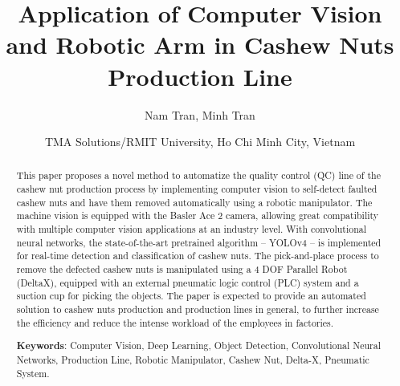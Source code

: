 \documentclass[10pt, letterpaper]{article}
\title{Application of Computer Vision and Robotic Arm in Cashew Nuts Production Line}
\author{Nam Tran, Minh Tran}
\date{TMA Solutions/RMIT University, Ho Chi Minh City, Vietnam} %
\begin{document}
\maketitle

\begin{abstract}
    This paper proposes a novel method to automatize the quality control (QC) line of the cashew nut production process by implementing computer vision to self-detect faulted cashew nuts and have them removed automatically using a robotic manipulator. The machine vision is equipped with the Basler Ace 2 camera, allowing great compatibility with multiple computer vision applications at an industry level. With convolutional neural networks, the state-of-the-art pretrained algorithm – YOLOv4 – is implemented for real-time detection and classification of cashew nuts. The pick-and-place process to remove the defected cashew nuts is manipulated using a 4 DOF Parallel Robot (DeltaX), equipped with an external pneumatic logic control (PLC) system and a suction cup for picking the objects. The paper is expected to provide an automated solution to cashew nuts production and production lines in general, to further increase the efficiency and reduce the intense workload of the employees in factories.\par
    \textbf{Keywords}: Computer Vision, Deep Learning, Object Detection, Convolutional Neural Networks, Production Line, Robotic Manipulator, Cashew Nut, Delta-X, Pneumatic System.
\end{abstract}
\end{document}
